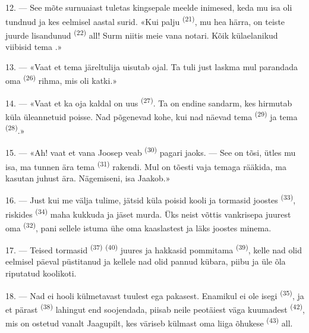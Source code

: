 12. --- See mõte surnuaiast tuletas kingsepale meelde inimesed, keda mu isa oli tundnud
ja kes eelmisel aastal surid. «Kui palju  \textsuperscript{(21)}, mu hea
härra, on teiste juurde lisandunud  \textsuperscript{(22)} all! Surm
niitis meie vana notari. Kõik külaelanikud viibisid tema .»

13. --- «Vaat et tema järeltulija uisutab ojal. Ta tuli just laskma mul parandada oma
 \textsuperscript{(26)} rihma, mis oli katki.»

14. --- «Vaat et ka oja kaldal on uus  \textsuperscript{(27)}. Ta on
endine sandarm, kes hirmutab küla üleannetuid poisse. Nad põgenevad kohe, kui nad
näevad tema  \textsuperscript{(29)} ja tema 
\textsuperscript{(28)}.»

15. --- «Ah! vaat et vana Joosep veab  \textsuperscript{(30)}
pagari jaoks. --- See on tõsi, ütles mu isa, ma tunnen ära tema 
\textsuperscript{(31)} rakendi. Mul on tõesti vaja temaga rääkida, ma kasutan juhust ära.
Nägemiseni, isa Jaakob.»

16. --- Just kui me välja tulime, jätsid küla poisid kooli ja tormasid joostes
 \textsuperscript{(33)}, riskides 
\textsuperscript{(34)} maha kukkuda ja jäset murda. Üks neist võttis vankrisepa juurest
oma  \textsuperscript{(32)}, pani sellele istuma ühe oma kaaslastest ja
läks joostes minema.

17. --- Teised tormasid  \textsuperscript{(37)} 
\textsuperscript{(40)} juures ja hakkasid pommitama 
\textsuperscript{(39)}, kelle nad olid eelmisel päeval püstitanud ja kellele nad olid
pannud kübara, piibu ja üle õla riputatud koolikoti.

18. --- Nad ei hooli külmetavast tuulest ega pakasest. Enamikul ei ole isegi
 \textsuperscript{(35)}, ja et pärast 
\textsuperscript{(38)} lahingut end soojendada, piisab neile peotäiest väga kuumadest
 \textsuperscript{(42)}, mis on ostetud vanalt 
Jaagupilt, kes väriseb külmast oma liiga õhukese 
\textsuperscript{(43)} all.

\VUsaut{3.0mm}
\VUsaut{3.0mm}

